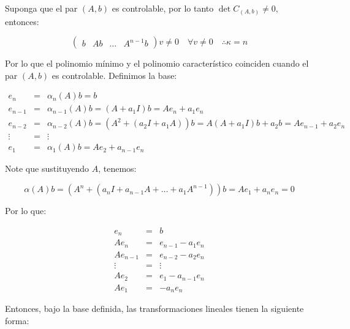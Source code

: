        Suponga que el par $(A,b)$ es controlable, por lo tanto $\det{C_{(A,b)}} \ne 0$, entonces:

        \begin{equation}
            \begin{pmatrix}
            b & A b & \dots & A^{n-1} b
            \end{pmatrix} v \ne 0 \quad \forall v \ne 0 \quad \therefore \kappa = n
        \end{equation}

        Por lo que el polinomio mínimo y el polinomio característico coinciden cuando el par $(A,b)$ es controlable. Definimos la base:

        \begin{eqnarray}
        e_n & = & \alpha_n(A) b = b \nonumber \\
        e_{n-1} & = & \alpha_{n-1}(A) b = (A + a_1I) b = A e_n + a_1 e_n \nonumber \\
        e_{n-2} & = & \alpha_{n-2}(A) b = (A^2 + (a_2I + a_1A)) b = A(A+a_1I) b + a_2 b = A e_{n-1} + a_2 e_n \nonumber \\
        \vdots & = & \vdots \nonumber \\
        e_1 & = & \alpha_1(A) b = A e_2 + a_{n-1} e_n
        \end{eqnarray}

        Note que sustituyendo $A$, tenemos:

        \begin{equation}
            \alpha(A) b = (A^n + (a_nI + a_{n-1}A + \dots + a_1 A^{n-1})) b = A e_1 + a_n e_n = 0
        \end{equation}

        Por lo que:

        \begin{eqnarray}
        e_n & = & b \nonumber \\
        A e_{n} & = & e_{n-1} - a_1 e_n \nonumber \\
        A e_{n-1} & = & e_{n-2} - a_2 e_n \nonumber \\
        \vdots & = & \vdots \nonumber \\
        A e_2 & = & e_1 - a_{n-1} e_n \nonumber \\
        A e_1 & = & - a_{n} e_n
        \end{eqnarray}

        Entonces, bajo la base definida, las transformaciones lineales tienen la siguiente forma:


